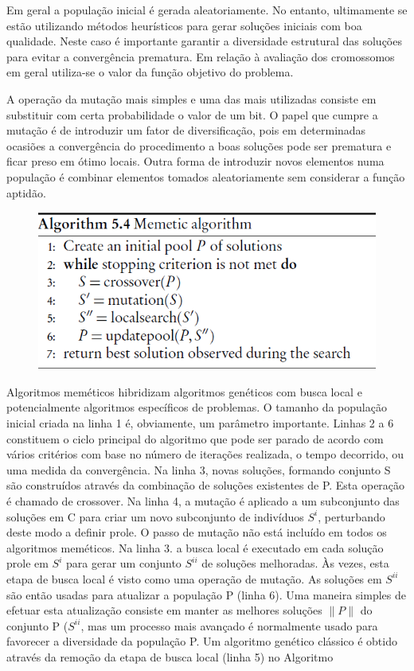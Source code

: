 Em geral a população inicial é gerada aleatoriamente. No entanto, ultimamente se estão utilizando métodos heurísticos para gerar soluções iniciais com boa qualidade. Neste caso é importante garantir a diversidade estrutural das soluções para evitar a convergência prematura. Em relação à avaliação dos cromossomos em geral utiliza-se o valor da função objetivo do problema. 

A operação da mutação mais simples e uma das mais utilizadas consiste em substituir com certa probabilidade o valor de um bit. O papel que cumpre a mutação é de introduzir um fator de diversificação, pois em determinadas ocasiões a convergência do procedimento a boas soluções pode ser prematura e ficar preso em ótimo locais. Outra forma de introduzir novos elementos numa população é combinar elementos tomados aleatoriamente sem considerar a função aptidão. 
 
\begin{figure}[ht!]
\centering
\includegraphics[scale=0.8]{figuras/alg-4.PNG}
\label{alg-4}
\end{figure}

 
Algoritmos meméticos hibridizam algoritmos genéticos com busca local e potencialmente algoritmos específicos de problemas. O tamanho da população inicial criada na linha 1 é, obviamente, um parâmetro importante. Linhas 2 a 6 constituem o ciclo principal do algoritmo que pode ser parado de acordo com vários critérios com base no número de iterações realizada, o tempo decorrido, ou uma medida da convergência. Na linha 3, novas soluções, formando conjunto S são construídos através da combinação de soluções existentes de P. Esta operação é chamado de crossover. Na linha 4, a mutação é aplicado a um subconjunto das soluções em C para criar um novo subconjunto de indivíduos $ S^{i} $, perturbando deste modo a definir prole. O passo de mutação não está incluído em todos os algoritmos meméticos. Na linha 3. a busca local é executado em cada solução prole em $ S^{i} $ para gerar um conjunto $ S^{ii} $ de soluções melhoradas. Às vezes, esta etapa de busca local é visto como uma operação de mutação. As soluções em $ S^{ii} $ são então usadas para atualizar a população P (linha 6). Uma maneira simples de efetuar esta atualização consiste em manter as melhores soluções $ \|P\| $ do conjunto P ($ S^{ii} $, mas um processo mais avançado é normalmente usado para favorecer a diversidade da população P. Um algoritmo genético clássico é obtido através da remoção da etapa de busca local (linha 5) no Algoritmo

